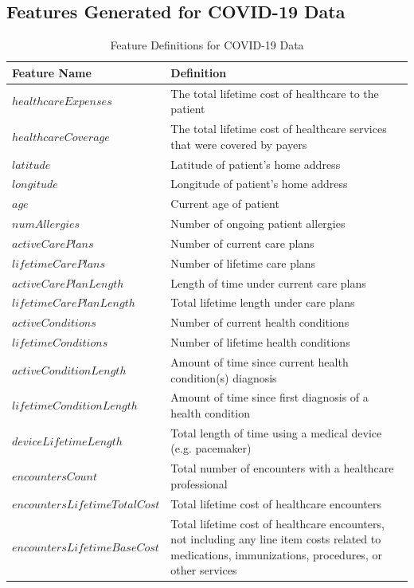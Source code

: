 \documentclass[ijds,nonblindrev]{informs-ijds}
\begin{document}
\begin{APPENDICES}
\begin{table}[!ht]
\end{table}
\newpage
\section{Features Generated for COVID-19 Data}
\begin{table} [!ht]
\caption{\label{covidfeatures}Feature Definitions for COVID-19 Data}
\begin{tabular}{l|p{4.0in}}
\textbf{Feature Name} & \textbf{Definition} \\ \hline
$healthcareExpenses$ & The total lifetime cost of healthcare to the patient          \\
$healthcareCoverage$ & The total lifetime cost of healthcare services that were covered by payers          \\
$latitude$ & Latitude of patient's home address \\
$longitude$ & Longitude of patient's home address\\
$age$ & Current age of patient\\
$numAllergies$ & Number of ongoing patient allergies\\
$activeCarePlans$ & Number of current care plans\\
$lifetimeCarePlans$ & Number of lifetime care plans\\
$activeCarePlanLength$ & Length of time under current care plans\\
$lifetimeCarePlanLength$ & Total lifetime length under care plans\\
$activeConditions$ & Number of current health conditions\\
$lifetimeConditions$ & Number of lifetime health conditions\\
$activeConditionLength$ & Amount of time since current health condition(s) diagnosis\\
$lifetimeConditionLength$ & Amount of time since first diagnosis of a health condition \\
$deviceLifetimeLength$ & Total length of time using a medical device (e.g. pacemaker)  \\
$encountersCount$ & Total number of encounters with a healthcare professional\\
$encountersLifetimeTotalCost$ & Total lifetime cost of healthcare encounters \\
$encountersLifetimeBaseCost$ & Total lifetime cost of healthcare encounters, not including any line item costs related to medications, immunizations, procedures, or other services\\

\end{tabular}
\end{table}
\end{APPENDICES}
\end{document}
